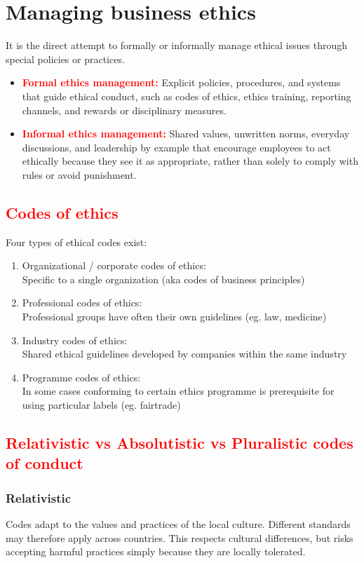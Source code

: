 \documentclass{article}
\DeclareRobustCommand{\k}[1]{\textcolor{red}{#1}}
\begin{document}
\section{Managing business ethics}
It is the direct attempt to formally or informally manage ethical issues through special
policies or practices.

\begin{itemize}
    \item \k{\textbf{Formal ethics management:}} Explicit policies, procedures, and systems that guide ethical conduct, such as codes of ethics, ethics training, reporting channels, and rewards or disciplinary measures.
    \item \k{\textbf{Informal ethics management:}} Shared values, unwritten norms, everyday discussions, and leadership by example that encourage employees to act ethically because they see it as appropriate, rather than solely to comply with rules or avoid punishment.
\end{itemize}

\newpage
\subsection{\k{Codes of ethics}}
Four types of ethical codes exist:
\begin{enumerate}
    \item Organizational / corporate codes of ethics:\\
        Specific to a single organization (aka codes of business principles)
    \item Professional codes of ethics:\\
        Professional groups have often their own guidelines (eg. law, medicine)
    \item Industry codes of ethics:\\
        Shared ethical guidelines developed by companies within the same industry
    \item Programme codes of ethics:\\
        In some cases conforming to certain ethics programme is prerequisite for using particular labels (eg. fairtrade)
\end{enumerate}

\subsection{\k{Relativistic vs Absolutistic vs Pluralistic codes of conduct}}
\subsubsection{Relativistic}
Codes adapt to the values and practices of the local culture. Different standards
may therefore apply across countries. This respects cultural differences, but risks
accepting harmful practices simply because they are locally tolerated.
\end{document}

